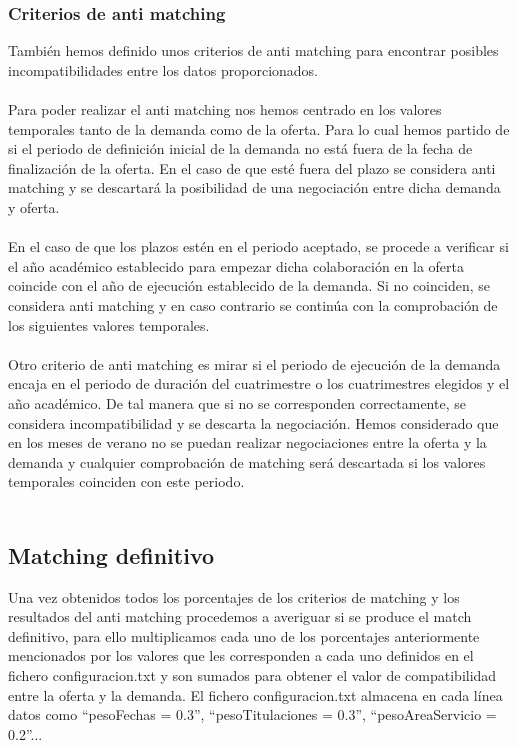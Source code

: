 \documentclass[11pt]{article}
\begin{document}
 \subsubsection{Criterios de anti matching }
 
 También hemos definido unos criterios de anti matching para encontrar posibles incompatibilidades entre los datos proporcionados.\\\\
 Para poder realizar el anti matching nos hemos centrado en los valores temporales tanto de la demanda como de la oferta. Para lo cual hemos partido de si el periodo de definición inicial de la demanda no está fuera de la fecha de finalización de la oferta. En el caso de que esté fuera del plazo se considera anti matching y se descartará la posibilidad de una negociación entre dicha demanda y oferta. \\\\
 
 En el caso de que los plazos estén en el periodo aceptado, se procede a verificar si el año académico establecido para empezar dicha colaboración en la oferta coincide con el año de ejecución establecido de la demanda. Si no coinciden, se considera anti matching y en caso contrario se continúa con la comprobación de los siguientes valores temporales.\\\\
 
 Otro criterio de anti matching es mirar si el periodo de ejecución de la demanda encaja en el periodo de duración del cuatrimestre o los cuatrimestres elegidos y el año académico. De tal manera que si no se corresponden correctamente, se considera incompatibilidad y se descarta la negociación. Hemos considerado que en los meses de verano no se puedan realizar negociaciones entre la oferta y la demanda y cualquier comprobación de matching será descartada si los valores temporales coinciden con este periodo.\\\\
 
 
  \subsection{Matching definitivo}

 Una vez obtenidos todos los porcentajes de los criterios de matching y los resultados del anti matching procedemos a averiguar si se produce el match definitivo, para ello multiplicamos cada uno de los porcentajes anteriormente mencionados por los valores que les corresponden a cada uno definidos en el fichero configuracion.txt y son sumados para obtener el valor de compatibilidad entre la oferta y la demanda. El fichero configuracion.txt almacena en cada línea datos como “pesoFechas = 0.3”, “pesoTitulaciones = 0.3”, “pesoAreaServicio = 0.2”...  \\\\
 
\end{document}
